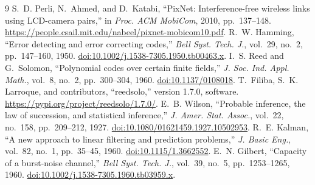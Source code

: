 \documentclass[conference,a4paper]{IEEEtran}
\begin{document}
\begin{thebibliography}{9}
 S.~D. Perli, N.~Ahmed, and D.~Katabi, ``PixNet:
Interference-free wireless links using LCD-camera pairs,'' in
\emph{Proc. ACM MobiCom}, 2010, pp.~137--148.
\url{https://people.csail.mit.edu/nabeel/pixnet-mobicom10.pdf}.
 R.~W. Hamming, ``Error detecting and error correcting
codes,'' \emph{Bell Syst. Tech. J.}, vol.~29, no.~2, pp.~147--160, 1950.
\href{https://doi.org/10.1002/j.1538-7305.1950.tb00463.x}{doi:10.1002/j.1538-7305.1950.tb00463.x}.
 I.~S. Reed and G.~Solomon, ``Polynomial codes over
certain finite fields,'' \emph{J. Soc. Ind. Appl. Math.}, vol.~8, no.~2,
pp.~300--304, 1960. \href{https://doi.org/10.1137/0108018}{doi:10.1137/0108018}.
 T.~Filiba, S.~K. Larroque, and contributors,
``reedsolo,'' version 1.7.0, software.
\url{https://pypi.org/project/reedsolo/1.7.0/}.
 E.~B. Wilson, ``Probable inference, the law of succession,
and statistical inference,'' \emph{J. Amer. Stat. Assoc.}, vol.~22,
no.~158, pp.~209--212, 1927.
\href{https://doi.org/10.1080/01621459.1927.10502953}{doi:10.1080/01621459.1927.10502953}.
 R.~E. Kalman, ``A new approach to linear filtering and
prediction problems,'' \emph{J. Basic Eng.}, vol.~82, no.~1,
pp.~35--45, 1960. \href{https://doi.org/10.1115/1.3662552}{doi:10.1115/1.3662552}.
 E.~N. Gilbert, ``Capacity of a burst-noise channel,''
\emph{Bell Syst. Tech. J.}, vol.~39, no.~5, pp.~1253--1265, 1960.
\href{https://doi.org/10.1002/j.1538-7305.1960.tb03959.x}{doi:10.1002/j.1538-7305.1960.tb03959.x}.
\end{thebibliography}
\end{document}
